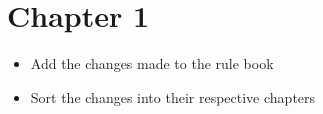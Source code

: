 \section{Chapter 1}

\begin{itemize}
	\item Add the changes made to the rule book
	\item Sort the changes into their respective chapters
\end{itemize}



